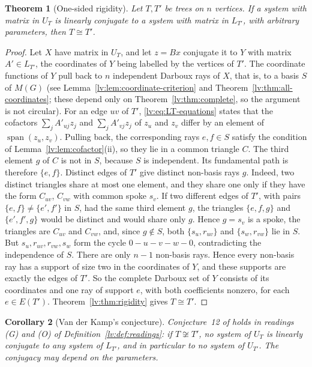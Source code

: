 \documentclass[11pt,a4paper]{article}
\newtheorem{theorem}{Theorem}[section]
\newtheorem{corollary}[theorem]{Corollary}
\theoremstyle{definition}
\theoremstyle{remark}
\begin{document}
\begin{theorem}[One-sided rigidity]
\label{lv:thm:one-sided}
Let $T,T'$ be trees on $n$ vertices. If a system with matrix in $U_T$ is linearly conjugate to a system with matrix in $L_{T'}$, with arbitrary parameters, then $T\cong T'$.
\end{theorem}

\begin{proof}
Let $X$ have matrix in $U_T$, and let $z=Bx$ conjugate it to $Y$ with matrix $A'\in L_{T'}$, the coordinates of $Y$ being labelled by the vertices of $T'$. The coordinate functions of $Y$ pull back to $n$ independent Darboux rays of $X$, that is, to a basis $S$ of $M(G)$ (see Lemma~\ref{lv:lem:coordinate-criterion} and Theorem~\ref{lv:thm:all-coordinates}; these depend only on Theorem~\ref{lv:thm:complete}, so the argument is not circular). For an edge $uv$ of $T'$, \eqref{lv:eq:LT-equations} states that the cofactors $\sum_jA'_{uj}z_j$ and $\sum_jA'_{vj}z_j$ of $z_u$ and $z_v$ differ by an element of $\operatorname{span}(z_u,z_v)$. Pulling back, the corresponding rays $e,f\in S$ satisfy the condition of Lemma~\ref{lv:lem:cofactor}(ii), so they lie in a common triangle $C$. The third element $g$ of $C$ is not in $S$, because $S$ is independent. Its fundamental path is therefore $\{e,f\}$. Distinct edges of $T'$ give distinct non-basis rays $g$. Indeed, two distinct triangles share at most one element, and they share one only if they have the form $C_{uv}$, $C_{vw}$ with common spoke $s_v$. If two different edges of $T'$, with pairs $\{e,f\}\neq\{e',f'\}$ in $S$, had the same third element $g$, the triangles $\{e,f,g\}$ and $\{e',f',g\}$ would be distinct and would share only $g$. Hence $g=s_v$ is a spoke, the triangles are $C_{uv}$ and $C_{vw}$, and, since $g\notin S$, both $\{s_u,r_{uv}\}$ and $\{s_w,r_{vw}\}$ lie in $S$. But $s_u,r_{uv},r_{vw},s_w$ form the cycle $0-u-v-w-0$, contradicting the independence of $S$. There are only $n-1$ non-basis rays. Hence every non-basis ray has a support of size two in the coordinates of $Y$, and these supports are exactly the edges of $T'$. So the complete Darboux set of $Y$ consists of its coordinates and one ray of support $e$, with both coefficients nonzero, for each $e\in E(T')$. Theorem~\ref{lv:thm:rigidity} gives $T\cong T'$.
\end{proof}

\begin{corollary}[Van der Kamp's conjecture]
\label{lv:cor:conjecture}
Conjecture~12 of \cite{lv:K2025} holds in readings (G) and (O) of Definition~\ref{lv:def:readings}: if $T\not\cong T'$, no system of $U_T$ is linearly conjugate to any system of $L_{T'}$, and in particular to no system of $U_{T'}$. The conjugacy may depend on the parameters.
\end{corollary}
\end{document}
